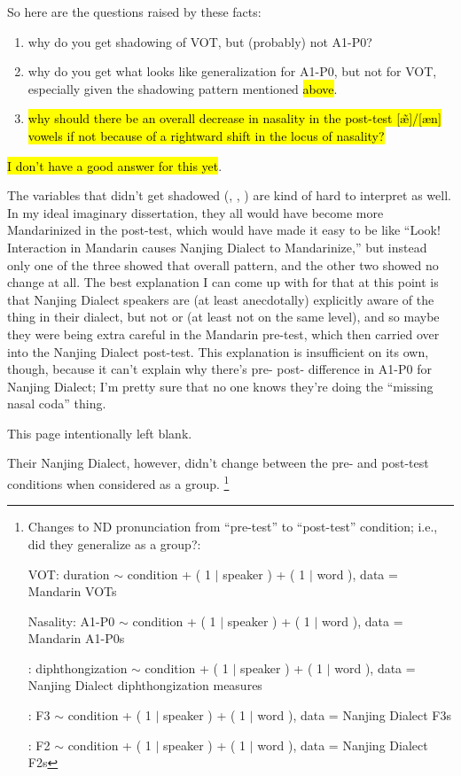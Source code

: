 So here are the questions raised by these facts:

\begin{enumerate}
    \item why do you get shadowing of VOT, but (probably) not A1-P0?
    \item why do you get what looks like generalization for A1-P0, but not for VOT, especially given the shadowing pattern mentioned \hl{above}.
    \item \hl{why should there be an overall decrease in nasality in the post-test [\~\ae]/[\ae n] vowels if not because of a rightward shift in the locus of nasality?}
\end{enumerate} \hl{I don't have a good answer for this yet}.

The variables that didn't get shadowed (\textipa{[e]/[iE]}, \textipa{[I]/[y]}, \textipa{[l]/[n]}) are kind of hard to interpret as well. In my ideal imaginary dissertation, they all would have become more Mandarinized in the post-test, which would have made it easy to be like ``Look! Interaction in Mandarin causes Nanjing Dialect to Mandarinize,''  but instead only one of the three showed that overall pattern, and the other two showed no change at all. The best explanation I can come up with for that at this point is that Nanjing Dialect speakers are (at least anecdotally) explicitly aware of the \textipa{[l]/[n]} thing in their dialect, but not \textipa{[e]/[iE]} or \textipa{[I]/[y]} (at least not on the same level), and so maybe they were being extra careful in the Mandarin pre-test, which then carried over into the Nanjing Dialect post-test. This explanation is insufficient on its own, though, because it can't explain why there's pre- post- difference in A1-P0 for Nanjing Dialect; I'm pretty sure that no one knows they're doing the ``missing nasal coda'' thing.

\pagebreak

This page intentionally left blank.

\pagebreak

Their Nanjing Dialect, however, didn't change between the pre- and post-test conditions when considered as a group.
\footnote{Changes to ND pronunciation from ``pre-test'' to ``post-test'' condition; i.e., did they generalize as a group?:

VOT: duration $\sim$ condition + ( 1 $|$ speaker ) + ( 1 $|$ word ), data = Mandarin VOTs

Nasality: A1-P0 $\sim$ condition + ( 1 $|$ speaker ) + ( 1 $|$ word ), data = Mandarin A1-P0s

\textipa{[e]/[iE]}: diphthongization $\sim$ condition + ( 1 $|$ speaker ) + ( 1 $|$ word ), data = Nanjing Dialect diphthongization measures

\textipa{[i]/[y]}: F3 $\sim$ condition + ( 1 $|$ speaker ) + ( 1 $|$ word ), data = Nanjing Dialect F3s

\textipa{[l]/[n]}: F2 $\sim$ condition + ( 1 $|$ speaker ) + ( 1 $|$ word ), data = Nanjing Dialect F2s

}

